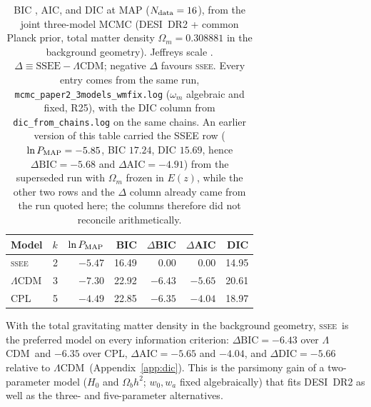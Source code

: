 \documentclass[12pt,a4paper]{article}
\newcommand{\SSEE}{\ifmmode\mathrm{SSEE}\else\textsc{ssee}\fi}
\newcommand{\LCDM}{\ifmmode\Lambda\mathrm{CDM}\else$\Lambda$CDM\fi}
\begin{document}
\begin{table}[H]
\centering
\caption{BIC \citep{Schwarz1978}, AIC, and DIC at MAP ($N_{\rm data}=16$), from
the joint three-model MCMC (DESI~DR2 + common Planck prior, total matter density
$\Omega_m=0.308881$ in the background geometry). Jeffreys scale
\citep{Jeffreys1961}. $\Delta\equiv{}-\Lambda\mathrm{CDM}$; negative $\Delta$ favours \SSEE.
Every entry comes from the same run, \texttt{mcmc\_paper2\_3models\_wmfix.log}
($\omega_m$ algebraic and fixed, R25), with the DIC column from
\texttt{dic\_from\_chains.log} on the same chains. An earlier version of this
table carried the SSEE row ($\ln P_{\rm MAP}=-5.85$, BIC $17.24$, DIC $15.69$,
hence $\Delta\mathrm{BIC}=-5.68$ and $\Delta\mathrm{AIC}=-4.91$) from the
superseded run with $\Omega_m$ frozen in $E(z)$, while the other two rows and
the $\Delta$ column already came from the run quoted here; the columns
therefore did not reconcile arithmetically.}
\label{tab:model_comp}
\begin{tabular}{lrrrrrr}
\toprule
Model & $k$ & $\ln P_{\rm MAP}$ & BIC & $\Delta$BIC & $\Delta$AIC & DIC \\
\midrule
\SSEE & 2 & $-5.47$ & 16.49 & $0.00$  & $0.00$  & 14.95 \\
\LCDM      & 3 & $-7.30$ & 22.92 & $-6.43$ & $-5.65$ & 20.61 \\
CPL        & 5 & $-4.49$ & 22.85 & $-6.35$ & $-4.04$ & 18.97 \\
\bottomrule
\end{tabular}
\end{table}

With the total gravitating matter density in the background geometry, \SSEE\ is
the preferred model on every information criterion: $\Delta\mathrm{BIC}=-6.43$
over \LCDM\ and $-6.35$ over CPL, $\Delta\mathrm{AIC}=-5.65$ and $-4.04$, and
$\Delta\mathrm{DIC}=-5.66$ relative to \LCDM\ (Appendix~\ref{app:dic}). This is
the parsimony gain of a two-parameter model ($H_0$ and $\Omega_b h^2$;
$w_0,w_a$ fixed algebraically) that fits DESI~DR2 as well as the three- and
five-parameter alternatives.
\end{document}
